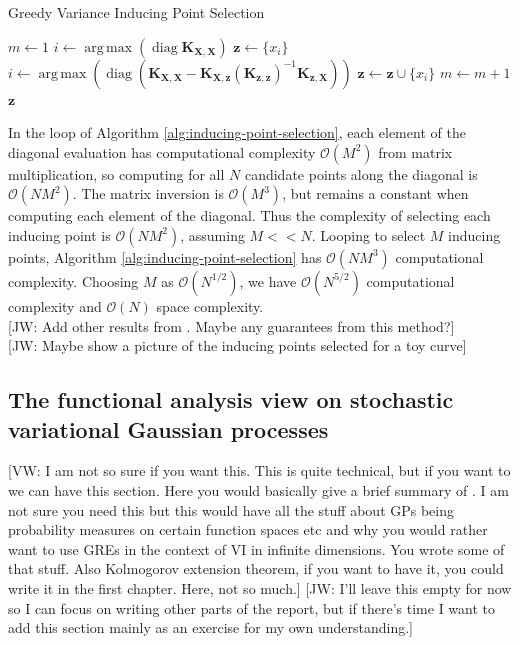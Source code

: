\documentclass{article}
\newcommand{\jw}[1]{{\color{gray} [JW: #1]}}
\newcommand{\vw}[1]{{\color{green} [VW: #1]}}
\newcommand{\diag}{\operatorname{diag}}
\DeclareMathOperator*{\argmax}{arg\,max}
\numberwithin{equation}{section}
\begin{document}
\begin{algorithm}
\caption{Greedy Variance Inducing Point Selection}\label{alg:inducing-point-selection}
\begin{algorithmic}
\State $m \leftarrow 1$
 \State $i \leftarrow \argmax \left(\diag\mathbf{K}_{\mathbf{X}, \mathbf{X}}\right) $
 \State $\mathbf{z} \leftarrow \{x_i\}$
\State$i \leftarrow \argmax \left(\diag \left(\mathbf{K}_{\mathbf{X}, \mathbf{X}} - \mathbf{K}_{\mathbf{X}, \mathbf{z}} \left(\mathbf{K}_{\mathbf{z}, \mathbf{z}}\right)^{-1}\mathbf{K}_{\mathbf{z}, \mathbf{X}}\right)\right)$
 \State  $\mathbf{z} \leftarrow \mathbf{z} \cup \{x_i\}$
 \State  $m \leftarrow m+1$
\EndWhile
\State \Return $\mathbf{z}$
\end{algorithmic}
\end{algorithm}

In the loop of Algorithm \ref{alg:inducing-point-selection}, each element of the diagonal evaluation has computational complexity $\mathcal{O}(M^2)$ from matrix multiplication, so computing for all $N$ candidate points along the diagonal is $\mathcal{O}(NM^2)$. 
The matrix inversion is $\mathcal{O}(M^3)$, but remains a constant when computing each element of the diagonal. 
Thus the complexity of selecting each inducing point is $\mathcal{O}(NM^2)$, assuming $M << N$. 
Looping to select $M$ inducing points, Algorithm \ref{alg:inducing-point-selection} has $\mathcal{O}(NM^3)$ computational complexity. 
Choosing $M$ as $\mathcal{O}(N^{1/2})$, we have $\mathcal{O}(N^{5/2})$ computational complexity and $\mathcal{O}(N)$ space complexity. 
\\\jw{Add other results from \cite{burt2020convergence}. Maybe any guarantees from this method?}
\\\jw{Maybe show a picture of the inducing points selected for a toy curve}

\subsection{The functional analysis view on stochastic variational Gaussian processes}
\vw{I am not so sure if you want this. This is quite technical, but if you want to we can have this section. Here you would basically give a brief summary of \cite{wynne2022variational}. I am not sure you need this but this would have all the stuff about GPs being probability measures on certain function spaces etc and why you would rather want to use GREs in the context of VI in infinite dimensions. You wrote some of that stuff. Also Kolmogorov extension theorem, if you want to have it, you could write it in the first chapter. Here, not so much.}
\jw{I'll leave this empty for now so I can focus on writing other parts of the report, but if there's time I want to add this section mainly as an exercise for my own understanding.}
\end{document}
